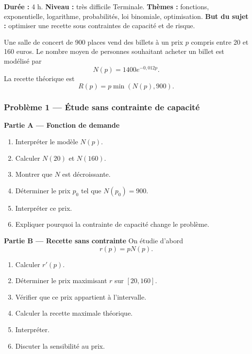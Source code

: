 \documentclass[11pt,a4paper]{article}
\begin{document}
\hypertarget{M-EXCELLENCE-04}{}
\begin{difficile}
\textbf{Durée :} 4 h.  
\textbf{Niveau :} très difficile Terminale.  
\textbf{Thèmes :} fonctions, exponentielle, logarithme, probabilités, loi binomiale, optimisation.  
\textbf{But du sujet :} optimiser une recette sous contraintes de capacité et de risque.

\medskip

Une salle de concert de 900 places vend des billets à un prix $p$ compris entre 20 et 160 euros. Le nombre moyen de personnes souhaitant acheter un billet est modélisé par
\[
N(p)=1400e^{-0{,}012p}.
\]
La recette théorique est
\[
R(p)=p\min(N(p),900).
\]

\subsubsection*{Problème 1 — Étude sans contrainte de capacité}

\textbf{Partie A — Fonction de demande}
\begin{enumerate}
  \item Interpréter le modèle $N(p)$.
  \item Calculer $N(20)$ et $N(160)$.
  \item Montrer que $N$ est décroissante.
  \item Déterminer le prix $p_0$ tel que $N(p_0)=900$.
  \item Interpréter ce prix.
  \item Expliquer pourquoi la contrainte de capacité change le problème.
\end{enumerate}

\textbf{Partie B — Recette sans contrainte}
On étudie d'abord
\[
r(p)=pN(p).
\]
\begin{enumerate}
  \item Calculer $r'(p)$.
  \item Déterminer le prix maximisant $r$ sur $[20,160]$.
  \item Vérifier que ce prix appartient à l'intervalle.
  \item Calculer la recette maximale théorique.
  \item Interpréter.
  \item Discuter la sensibilité au prix.
\end{enumerate}


\end{difficile}
\end{document}

